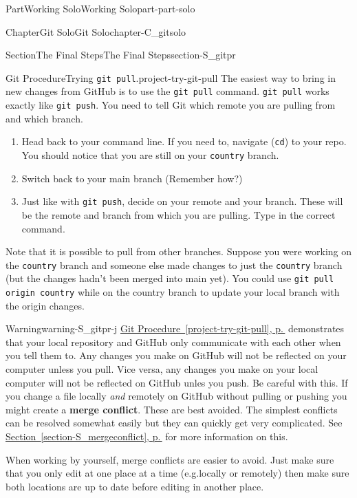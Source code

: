 \documentclass[twoside,10pt,]{book}
\newcommand{\xreffont}{\relax}
\newcommand{\mono}[1]{\texttt{#1}}
\newcommand{\terminology}[1]{\textbf{#1}}
\begin{document}
\begin{partptx}{Part}{Working Solo}{}{Working Solo}{}{}{part-part-solo}
\begin{chapterptx}{Chapter}{Git Solo}{}{Git Solo}{}{}{chapter-C_gitsolo}
\begin{sectionptx}{Section}{The Final Steps}{}{The Final Steps}{}{}{section-S_gitpr}
\begin{project}{Git Procedure}{Trying \mono{git pull}.}{project-try-git-pull}%
%
%
The easiest way to bring in new changes from GitHub is to use the \mono{git pull} command. \mono{git pull} works exactly like \mono{git push}. You need to tell Git which remote you are pulling from and which branch.%
\begin{enumerate}[font=\bfseries,label=(\alph*),ref=\alph*]%
\item{}Head back to your command line. If you need to, navigate (\mono{cd}) to your repo. You should notice that you are still on your \mono{country} branch.%
\item{}Switch back to your main branch (Remember how?)%
\item{}Just like with \mono{git push}, decide on your remote and your branch. These will be the remote and branch from which you are pulling. Type in the correct command.%
\end{enumerate}%
Note that it is possible to pull from other branches. Suppose you were working on the \mono{country} branch and someone else made changes to just the \mono{country} branch (but the changes hadn't been merged into main yet). You could use \mono{git pull origin country} while on the country branch to update your local branch with the origin changes.%
\end{project}%
\begin{warning}{Warning}{}{warning-S_gitpr-j}%
%
\hyperref[project-try-git-pull]{Git Procedure~{\xreffont\ref{project-try-git-pull}}, p.\,\pageref{project-try-git-pull}} demonstrates that your local repository and GitHub only communicate with each other when you tell them to. Any changes you make on GitHub will not be reflected on your computer unless you pull. Vice versa, any changes you make on your local computer will not be reflected on GitHub unles you push. Be careful with this. If you change a file locally \emph{and} remotely on GitHub without pulling or pushing you might create a \terminology{merge conflict}. These are best avoided. The simplest conflicts can be resolved somewhat easily but they can quickly get very complicated. See \hyperref[section-S_mergeconflict]{Section~{\xreffont\ref{section-S_mergeconflict}}, p.\,\pageref{section-S_mergeconflict}} for more information on this.%
\par
When working by yourself, merge conflicts are easier to avoid. Just make sure that you only edit at one place at a time (e.g.\@ locally or remotely) then make sure both locations are up to date before editing in another place.%

\end{warning}
\end{sectionptx}
\end{chapterptx}
\end{partptx}
\end{document}
